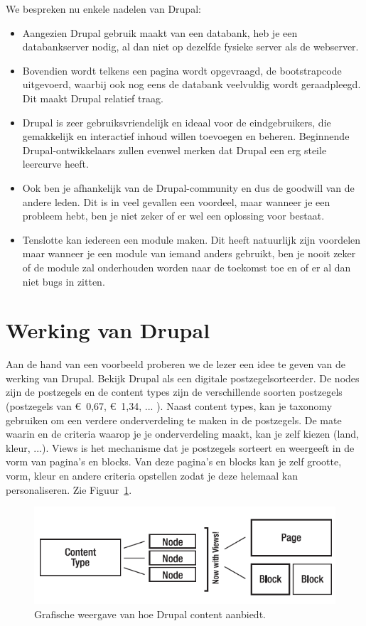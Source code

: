 We bespreken nu enkele nadelen van Drupal:
\begin{itemize}
\item Aangezien Drupal gebruik maakt van een databank, heb je een databankserver nodig, al dan niet op dezelfde fysieke server als de webserver.
\item Bovendien wordt telkens een pagina wordt opgevraagd, de bootstrapcode uitgevoerd, waarbij ook nog eens de databank veelvuldig wordt geraadpleegd. 
Dit maakt Drupal relatief traag.
\item Drupal is zeer gebruiksvriendelijk en ideaal voor de eindgebruikers, die gemakkelijk en interactief inhoud willen toevoegen en beheren. 
Beginnende Drupal-ontwikkelaars zullen evenwel merken dat Drupal een erg steile leercurve heeft.
\item Ook ben je afhankelijk van de Drupal-community en dus de goodwill van de andere leden. Dit is in veel gevallen een voordeel, maar wanneer je een probleem hebt, ben je niet zeker of er wel een oplossing voor bestaat.
\item Tenslotte kan iedereen een module maken. Dit heeft natuurlijk zijn voordelen maar wanneer je een module van iemand anders gebruikt, ben je nooit zeker of de module zal onderhouden worden naar de toekomst toe en of er al dan niet bugs in zitten.
\end{itemize}

\section{Werking van Drupal}

Aan de hand van een voorbeeld proberen we de lezer een idee te geven van de werking van Drupal. Bekijk Drupal als een digitale postzegelsorteerder. De nodes zijn de postzegels en de content types zijn de verschillende soorten postzegels (postzegels van \euro~0,67, \euro~1,34, ... ). Naast content types, kan je taxonomy gebruiken om een verdere onderverdeling te maken in de postzegels. De mate waarin en de criteria waarop je je onderverdeling maakt, kan je zelf kiezen (land, kleur, ...). Views is het mechanisme dat je postzegels sorteert en weergeeft in de vorm van pagina's en blocks. Van deze pagina's en blocks kan je zelf grootte, vorm, kleur en andere criteria opstellen zodat je deze helemaal kan personaliseren. Zie Figuur~\ref{fig:drupalGrafischeWeergave}.

\begin{figure}[h]
\centering
\includegraphics{fig/drupalGrafischeWeergave}
\centering
\vspace{-10pt}
\caption{Grafische weergave van hoe Drupal content aanbiedt.}
\vspace{-10pt}
\label{fig:drupalGrafischeWeergave}
\end{figure}

